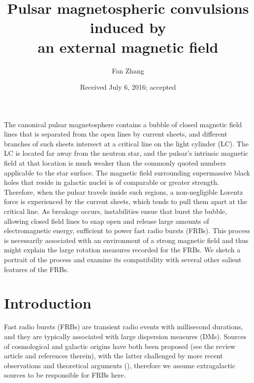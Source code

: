 \documentclass{aa}
\begin{document}
 

   \title{Pulsar magnetospheric convulsions induced by\\ an external magnetic field}
   \author{Fan Zhang
          }
   \date{Received July 6, 2016; accepted }

 
  \abstract
{The canonical pulsar magnetosphere contains a bubble of closed magnetic field lines that is separated from the open lines by current sheets, and different branches of such sheets intersect at a critical line on the light cylinder (LC). The LC is located far away from the neutron star, and the pulsar's intrinsic magnetic field at that location is much weaker than the commonly quoted numbers applicable to the star surface. 
The magnetic field surrounding supermassive black holes that reside in galactic nuclei is of comparable or greater strength. Therefore, when the pulsar travels inside such regions, a non-negligible Lorentz force is experienced by the current sheets, which tends to pull them apart at the critical line. As breakage occurs, instabilities ensue that burst the bubble, allowing closed field lines to snap open and release large amounts of electromagnetic energy, sufficient to power fast radio bursts (FRBs). This process is necessarily associated with an environment of a strong magnetic field and thus might explain the large rotation measures recorded for the FRBs. We sketch a portrait of the process and examine its compatibility with several other salient features of the FRBs. }



   \maketitle
%

\section{Introduction}\label{sec:Intro}
Fast radio bursts (FRBs) are transient radio events with millisecond durations, and they are typically associated with large dispersion measures (DMs). Sources of cosmological and galactic origins have both been proposed (see the review article \cite{2016MPLA...3130013K} and references therein), with the latter challenged by more recent observations and theoretical arguments (\cite{2015Natur.528..523M,2016ApJ...818...19K,2014ApJ...785L..26L}), therefore we assume extragalactic sources to be responsible for
FRBs here.
\end{document}
